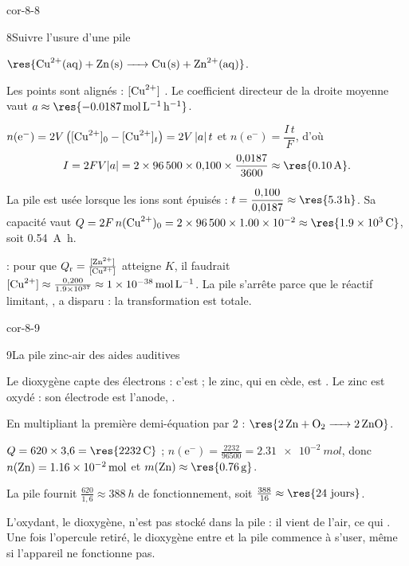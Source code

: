 \begin{blocLivre}{cor-8-8}
\begin{corrige}{8}{Suivre l'usure d'une pile}
\begin{questions}
\item $\res{\ce{Cu^2+(aq) + Zn(s) -> Cu(s) + Zn^2+(aq)}}$.
\item Les points sont alignés : $[\ce{Cu^2+}]$ . Le coefficient directeur de la droite
moyenne vaut $a\approx\res{\qty{-0,0187}{mol.L^{-1}.h^{-1}}}$.
\item $n(\mathrm{e}^-)=2V\,\big([\ce{Cu^2+}]_0-[\ce{Cu^2+}]_t\big)=2V\,|a|\,t$ et $n(\mathrm{e}^-)=\dfrac{I\,t}{F}$, d'où
\[I=2FV|a|=2\times\num{96500}\times0{,}100\times\frac{0{,}0187}{3600}\approx\res{\qty{0,10}{A}}.\]
\item La pile est usée lorsque les ions  sont épuisés : $t=\dfrac{0{,}100}{0{,}0187}\approx\res{\qty{5,3}{h}}$. Sa capacité
vaut $Q=2F\,n(\ce{Cu^2+})_0=2\times\num{96500}\times\num{1.00e-2}\approx\res{\qty{1,9e3}{C}}$, soit \qty{0,54}{A.h}.
\item {} : pour que $Q_\mathrm{r}=\frac{[\ce{Zn^2+}]}{[\ce{Cu^2+}]}$ atteigne $K$, il faudrait
$[\ce{Cu^2+}]\approx\frac{0{,}200}{\num{1.9e37}}\approx\qty{1e-38}{mol.L^{-1}}$. La pile s'arrête parce que le réactif limitant,
, a disparu : la transformation est totale.
\end{questions}
\end{corrige}
\end{blocLivre}
\begin{blocLivre}{cor-8-9}
\begin{corrige}{9}{La pile zinc-air des aides auditives}
\begin{questions}
\item Le dioxygène capte des électrons : c'est  ; le zinc, qui en cède, est .
Le zinc est oxydé : son électrode est l'anode, .
\item En multipliant la première demi-équation par 2 : $\res{\ce{2 Zn + O2 -> 2 ZnO}}$.
\item $Q=620\times3{,}6=\res{\qty{2232}{C}}$ ; $n(\mathrm{e}^-)=\frac{2232}{96500}=\qty{2,31e-2}{mol}$, donc
$n(\ce{Zn})=\qty{1,16e-2}{mol}$ et $m(\ce{Zn})\approx\res{\qty{0,76}{g}}$.
\item La pile fournit $\frac{620}{1{,}6}\approx\qty{388}{h}$ de fonctionnement, soit $\frac{388}{16}\approx\res{24\text{ jours}}$.
\item L'oxydant, le dioxygène, n'est pas stocké dans la pile : il vient de l'air, ce qui . Une
fois l'opercule retiré, le dioxygène entre et la pile commence à s'user, même si l'appareil ne fonctionne pas.
\end{questions}
\end{corrige}
\end{blocLivre}
